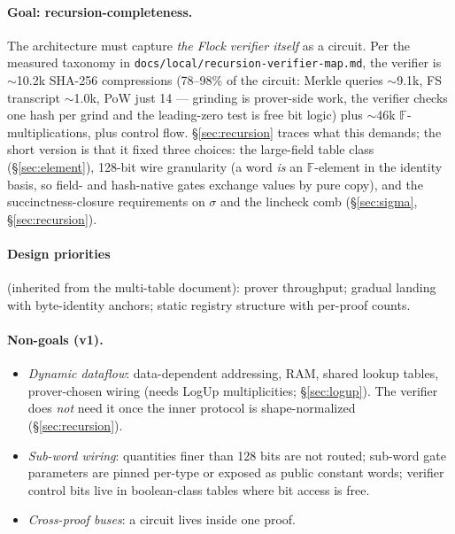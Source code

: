 \documentclass[11pt]{article}
\newcommand{\F}{\mathbb{F}}
\newcommand{\code}[1]{\texttt{#1}}
\theoremstyle{definition}
\begin{document}
\paragraph{Goal: recursion-completeness.} The architecture must capture
\emph{the Flock verifier itself} as a circuit. Per the measured taxonomy in
\code{docs/local/recursion-verifier-map.md}, the verifier is
$\sim$10.2k SHA-256 compressions (78--98\% of the circuit: Merkle queries
$\sim$9.1k, FS transcript $\sim$1.0k, PoW just 14 --- grinding is
prover-side work, the verifier checks one hash per grind and the
leading-zero test is free bit logic) plus $\sim$46k
$\F$-multiplications, plus control flow. \S\ref{sec:recursion} traces what this demands; the short
version is that it fixed three choices: the large-field table class
(\S\ref{sec:element}), 128-bit wire granularity (a word \emph{is} an
$\F$-element in the identity basis, so field- and hash-native gates
exchange values by pure copy), and the succinctness-closure requirements
on $\sigma$ and the lincheck comb (\S\ref{sec:sigma},
\S\ref{sec:recursion}).

\paragraph{Design priorities} (inherited from the multi-table document):
prover throughput; gradual landing with byte-identity anchors; static
registry structure with per-proof counts.

\paragraph{Non-goals (v1).}
\begin{itemize}[nosep]
  \item \emph{Dynamic dataflow}: data-dependent addressing, RAM, shared
        lookup tables, prover-chosen wiring (needs LogUp multiplicities;
        \S\ref{sec:logup}). The verifier does \emph{not} need it once the
        inner protocol is shape-normalized (\S\ref{sec:recursion}).
  \item \emph{Sub-word wiring}: quantities finer than 128 bits are not
        routed; sub-word gate parameters are pinned per-type or exposed as
        public constant words; verifier control bits live in boolean-class
        tables where bit access is free.
  \item \emph{Cross-proof buses}: a circuit lives inside one proof.
\end{itemize}

\end{document}

